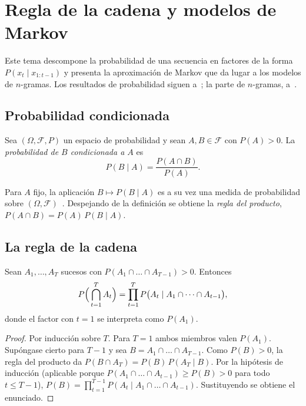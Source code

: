 \chapter{Regla de la cadena y modelos de Markov}
\label{tema:2}

Este tema descompone la probabilidad de una secuencia en factores de la forma $P(x_t\mid x_{1:t-1})$ y presenta la aproximación de Markov que da lugar a los modelos de $n$-gramas. Los resultados de probabilidad siguen a~\cite[§1.3]{bt}; la parte de $n$-gramas, a~\cite[§3.1]{jm3}.

\section{Probabilidad condicionada}

\begin{definicion}
Sea $(\Omega,\mathcal{F},P)$ un espacio de probabilidad y sean $A,B\in\mathcal{F}$ con $P(A)>0$. La \emph{probabilidad de $B$ condicionada a $A$} es
\[
P(B\mid A)=\frac{P(A\cap B)}{P(A)}.
\]
\end{definicion}

Para $A$ fijo, la aplicación $B\mapsto P(B\mid A)$ es a su vez una medida de probabilidad sobre $(\Omega,\mathcal{F})$~\cite[§1.3]{bt}. Despejando de la definición se obtiene la \emph{regla del producto}, $P(A\cap B)=P(A)\,P(B\mid A)$.

\section{La regla de la cadena}

\begin{teorema}\label{teo:cadena}
Sean $A_1,\dots,A_T$ sucesos con $P(A_1\cap\dots\cap A_{T-1})>0$. Entonces
\[
P\Bigl(\,\bigcap_{t=1}^{T}A_t\Bigr)=\prod_{t=1}^{T}P\bigl(A_t\mid A_1\cap\dots\cap A_{t-1}\bigr),
\]
donde el factor con $t=1$ se interpreta como $P(A_1)$.
\end{teorema}

\begin{proof}
Por inducción sobre $T$. Para $T=1$ ambos miembros valen $P(A_1)$. Supóngase cierto para $T-1$ y sea $B=A_1\cap\dots\cap A_{T-1}$. Como $P(B)>0$, la regla del producto da
$P(B\cap A_T)=P(B)\,P(A_T\mid B)$. Por la hipótesis de inducción (aplicable porque $P(A_1\cap\dots\cap A_{t-1})\ge P(B)>0$ para todo $t\le T-1$), $P(B)=\prod_{t=1}^{T-1}P(A_t\mid A_1\cap\dots\cap A_{t-1})$. Sustituyendo se obtiene el enunciado.
\end{proof}

